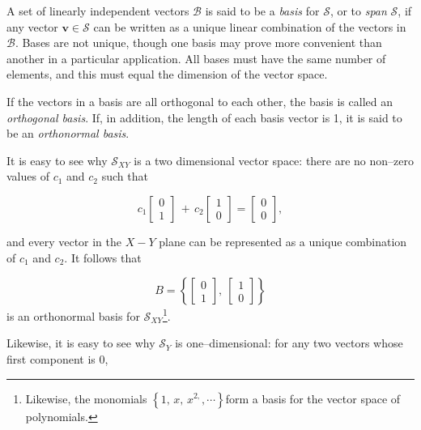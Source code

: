 \documentclass[graybox,envcountchap,sectrefs]{svmono}\usepackage[]{graphicx}\usepackage[]{xcolor}
\begin{document}
\begin{appendices}
A set of linearly independent vectors $\mathcal{{B}}$ is said to
be a \emph{basis} for $\mathcal{{S}}$, or to \emph{span} $\mathcal{{S}}$,
if any vector $\mathrm{\mathbf{v}}\in\mathcal{{S}}$ can be written
as a unique linear combination of the vectors in $\mathcal{{B}}$.
Bases are not unique, though one basis may prove more convenient than
another in a particular application. All bases must have the same
number of elements, and this must equal the dimension of the vector
space. 

If the vectors in a basis are all orthogonal to each other, the basis
is called an \emph{orthogonal basis}. If, in addition, the length
of each basis vector is 1, it is said to be an \emph{orthonormal basis}.

It is easy to see why $\mathcal{{S}}_{XY}$ is a two dimensional vector
space: there are no non--zero values of $c_{1}$ and $c_{2}$ such
that

\begin{equation}
c_{1}\left[\begin{array}{c}
0\\
1
\end{array}\right]\,+\,c_{2}\left[\begin{array}{c}
1\\
0
\end{array}\right]=\left[\begin{array}{c}
0\\
0
\end{array}\right],\label{eq:2DVectorSpace}
\end{equation}

and every vector in the $X-Y$ plane can be represented as a unique
combination of $c_{1}$ and $c_{2}$. It follows that 

\begin{equation}
{B}=\left\{ \left[\begin{array}{c}
0\\
1
\end{array}\right],\ \left[\begin{array}{c}
1\\
0
\end{array}\right]\right\} \label{eq:BasisForXYplane}
\end{equation}
 is an orthonormal basis for $\mathcal{{S}}_{XY}$\footnote{Likewise, the monomials $\left\{ 1,\,x,\,x^{2,},\cdots\right\} $form
a basis for the vector space of polynomials.}.

Likewise, it is easy to see why $\mathcal{{S}}_{Y}$ is one--dimensional:
for any two vectors whose first component is 0, 


\end{appendices}
\end{document}
